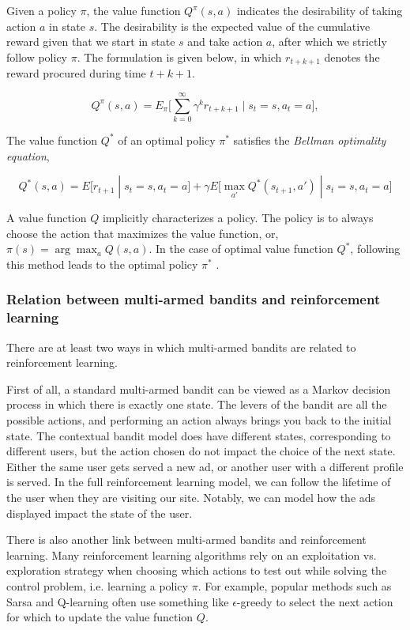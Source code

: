 \documentclass{article} %
\begin{document}
Given a policy $\pi$, the value function $Q^\pi(s,a)$ indicates the
desirability of taking action $a$ in state $s$. The desirability is the
expected value of the cumulative reward given that we start in state $s$ and
take action $a$, after which we strictly follow policy $\pi$. The formulation
is given below, in which $r_{t+k+1}$ denotes the reward procured during time
$t+k+1$.

\begin{equation}
  Q^\pi(s,a) = E_\pi \big[ \sum_{k=0}^\infty \gamma^k r_{t+k+1} \;|\; s_t = s,
  a_t = a\big],
\end{equation}

The value function $Q^*$ of an optimal policy $\pi^*$ satisfies the
\emph{Bellman optimality equation},

\begin{equation}
  Q^*(s,a) = E\big[r_{t+1} \;|\; s_t = s, a_t = a\big]
  + \gamma E\big[\max_{a'} Q^*(s_{t+1}, a') \;|\; s_t = s, a_t = a\big]
\end{equation}

A value function $Q$ implicitly characterizes a policy. The policy is to always
choose the action that maximizes the value function, or, $\pi(s) = \arg\max_a
Q(s,a)$. In the case of optimal value function $Q^*$, following this method
leads to the optimal policy $\pi^*$ \cite{abe2002empirical}.

\subsubsection{Relation between multi-armed bandits and reinforcement learning}

There are at least two ways in which multi-armed bandits are related to
reinforcement learning.

First of all, a standard multi-armed bandit can be viewed as a Markov decision
process in which there is exactly one state. The levers of the bandit are all
the possible actions, and performing an action always brings you back to the
initial state. The contextual bandit model does have different states,
corresponding to different users, but the action chosen do not impact the
choice of the next state. Either the same user gets served a new ad, or
another user with a different profile is served. In the full reinforcement
learning model, we can follow the lifetime of the user when they are visiting
our site. Notably, we can model how the ads displayed impact the state of the
user.

There is also another link between multi-armed bandits and reinforcement
learning. Many reinforcement learning algorithms rely on an exploitation vs.
exploration strategy when choosing which actions to test out while solving the
control problem, i.e. learning a policy $\pi$. For example, popular methods
such as Sarsa and Q-learning often use something like $\epsilon$-greedy to
select the next action for which to update the value function $Q$.
\end{document}
